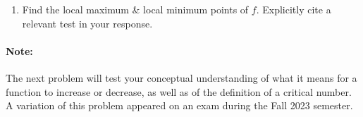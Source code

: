 \documentclass[10pt]{article}
\begin{document}
\begin{enumerate}
{Therefore, $f(x)$ is increasing on the interval $(-1, 1)$, and $f(x)$ is decreasing on the intervals $(-\infty, -1)$ and $(1, \infty)$.

}

\vfill

\item[(b)]Find the local maximum \& local minimum points of $f$. Explicitly cite a relevant test in your response. \\


\vfill

\end{enumerate}

\newpage

\paragraph*{Note:} The next problem will test your conceptual understanding of what it means for a function to increase or decrease, as well as of the definition of a critical number. A variation of this problem appeared on an exam during the Fall 2023 semester.\\
\end{document}
